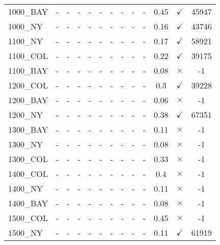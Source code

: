 \documentclass[main.tex]{subfiles}
\begin{document}
\begin{landscape}
\begin{center}
\begin{tabular}{lcccccccccccc}
1000\_BAY & - & - & - 
 & - & - & - 
 & - & - & - 
 & 0.45 & $\checkmark$ & 45947\\
1000\_NY & - & - & - 
 & - & - & - 
 & - & - & - 
 & 0.16 & $\checkmark$ & 43746\\
1100\_NY & - & - & - 
 & - & - & - 
 & - & - & - 
 & 0.17 & $\checkmark$ & 58921\\
1100\_COL & - & - & - 
 & - & - & - 
 & - & - & - 
 & 0.22 & $\checkmark$ & 39175\\
1100\_BAY & - & - & - 
 & - & - & - 
 & - & - & - 
 & 0.08 & $\times$ & -1\\
1200\_COL & - & - & - 
 & - & - & - 
 & - & - & - 
 & 0.3 & $\checkmark$ & 39228\\
1200\_BAY & - & - & - 
 & - & - & - 
 & - & - & - 
 & 0.06 & $\times$ & -1\\
1200\_NY & - & - & - 
 & - & - & - 
 & - & - & - 
 & 0.38 & $\checkmark$ & 67351\\
1300\_BAY & - & - & - 
 & - & - & - 
 & - & - & - 
 & 0.11 & $\times$ & -1\\
1300\_NY & - & - & - 
 & - & - & - 
 & - & - & - 
 & 0.08 & $\times$ & -1\\
1300\_COL & - & - & - 
 & - & - & - 
 & - & - & - 
 & 0.33 & $\times$ & -1\\
1400\_COL & - & - & - 
 & - & - & - 
 & - & - & - 
 & 0.4 & $\times$ & -1\\
1400\_NY & - & - & - 
 & - & - & - 
 & - & - & - 
 & 0.11 & $\times$ & -1\\
1400\_BAY & - & - & - 
 & - & - & - 
 & - & - & - 
 & 0.08 & $\times$ & -1\\
1500\_COL & - & - & - 
 & - & - & - 
 & - & - & - 
 & 0.45 & $\times$ & -1\\
1500\_NY & - & - & - 
 & - & - & - 
 & - & - & - 
 & 0.11 & $\checkmark$ & 61919\\
\hline\end{tabular}
\end{center}
\end{landscape}
\newpage
\end{document}
